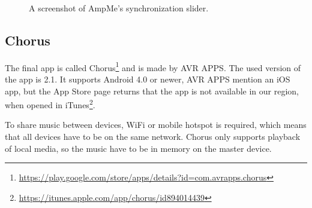 \begin{figure}[h!]
\begin{minipage}[b]{0.45\textwidth}
        \caption{A screenshot of AmpMe's synchronization slider.}\label{fig:ampme_slider}
    \end{minipage}
\end{figure}

\subsection{Chorus}\label{subsec:chorus}
The final app is called Chorus\footnote{\url{https://play.google.com/store/apps/details?id=com.avrapps.chorus}} and is made by AVR APPS.
The used version of the app is 2.1.
It supports Android 4.0 or newer, AVR APPS mention an iOS app, but the App Store page returns that the app is not available in our region,
when opened in iTunes\footnote{\url{https://itunes.apple.com/app/chorus/id894014439}}.

To share music between devices, WiFi or mobile hotspot is required,
which means that all devices have to be on the same network.
Chorus only supports playback of local media, so the music have to be in memory on the master device.


